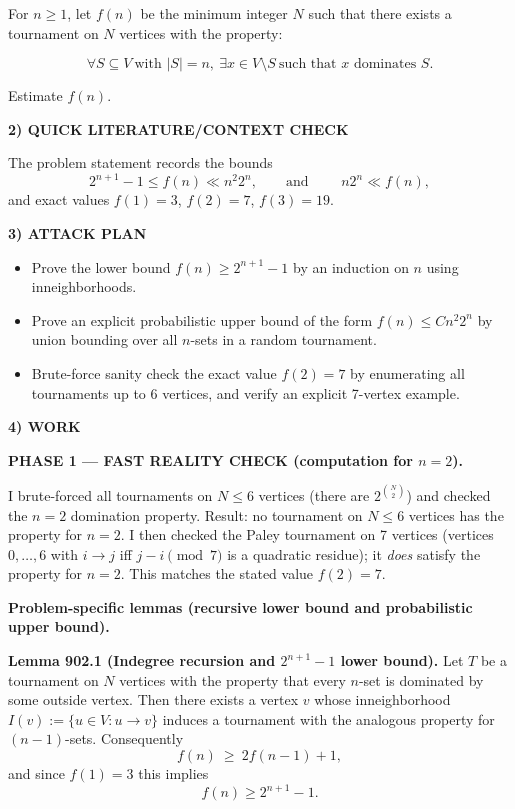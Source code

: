 For $n\ge 1$, let $f(n)$ be the minimum integer $N$ such that there exists a
tournament on $N$ vertices with the property:

\[ \forall S\subseteq V\ \text{with }|S|=n,\ \exists x\in V\setminus S\ \text{such that }x\text{ dominates }S. \]

Estimate $f(n)$.

\medskip
\noindent\textbf{2) QUICK LITERATURE/CONTEXT CHECK}

The problem statement records the bounds
\[2^{n+1}-1\le f(n)\ll n^2 2^n,\qquad\text{and }\qquad n2^n\ll f(n),
\]
and exact values $f(1)=3$, $f(2)=7$, $f(3)=19$.

\medskip
\noindent\textbf{3) ATTACK PLAN}

\begin{itemize}
\item Prove the lower bound $f(n)\ge 2^{n+1}-1$ by an induction on $n$ using
inneighborhoods.
\item Prove an explicit probabilistic upper bound of the form
$f(n)\le C n^2 2^n$ by union bounding over all $n$-sets in a random tournament.
\item Brute-force sanity check the exact value $f(2)=7$ by enumerating all
tournaments up to 6 vertices, and verify an explicit 7-vertex example.
\end{itemize}

\medskip
\noindent\textbf{4) WORK}

\textbf{PHASE 1 — FAST REALITY CHECK (computation for $n=2$).}

I brute-forced all tournaments on $N\le 6$ vertices (there are $2^{\binom{N}{2}}$)
and checked the $n=2$ domination property.
Result: no tournament on $N\le 6$ vertices has the property for $n=2$.
I then checked the Paley tournament on 7 vertices (vertices $0,\dots,6$ with
$i\to j$ iff $j-i\pmod 7$ is a quadratic residue); it \emph{does} satisfy the
property for $n=2$.
This matches the stated value $f(2)=7$.

\medskip
\textbf{Problem-specific lemmas (recursive lower bound and probabilistic upper bound).}

\medskip
\noindent\textbf{Lemma 902.1 (Indegree recursion and $2^{n+1}-1$ lower bound).}
Let $T$ be a tournament on $N$ vertices with the property that every $n$-set is
dominated by some outside vertex. Then there exists a vertex $v$ whose
inneighborhood $I(v):=\{u\in V: u\to v\}$ induces a tournament with the analogous
property for $(n-1)$-sets.
Consequently
\[ f(n)\ \ge\ 2 f(n-1)+1, \]
and since $f(1)=3$ this implies
\[ f(n)\ge 2^{n+1}-1. \]

